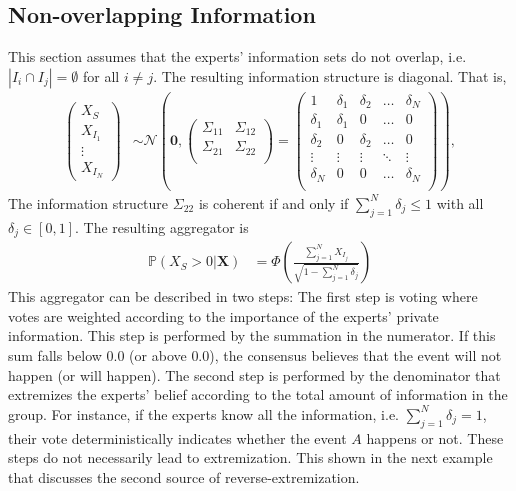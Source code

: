 \documentclass[11pt,twoside]{article}
\renewcommand{\P}{\mathbb{P}}
\theoremstyle{definition}
\theoremstyle{definition}
\begin{document}
\subsection{Non-overlapping Information}
\label{nonoverlap}
This section assumes that the experts' information sets do not overlap, i.e.   $|I_{i} \cap I_{j}| = \emptyset$ for all $i \neq j$. The resulting information structure is diagonal.  That is,
\begin{align*}
\left(\begin{matrix} X_{S} \\ X_{I_1}\\ \vdots \\ X_{I_N} \end{matrix}\right) &\sim \mathcal{N}\left( 
 \boldsymbol{0}, \left(\begin{matrix} 
\Sigma_{11} & \Sigma_{12}\\
\Sigma_{21} & \Sigma_{22}\\
 \end{matrix}\right) 
 =
 \left(\begin{array}{c|cccc}
1 & \delta_1 & \delta_2 & \dots & \delta_N  \\ \hline
\delta_1 & \delta_1 &0 & \dots & 0   \\ 
\delta_2 & 0 & \delta_2 & \dots & 0  \\ 
\vdots & \vdots & \vdots & \ddots & \vdots  \\ 
\delta_N & 0 & 0 & \dots & \delta_N\\ 
 \end{array}\right)\right),
\end{align*}
The information structure $\Sigma_{22}$  is coherent if and only if $\sum_{j=1}^N \delta_j \leq 1$ with all $\delta_j \in [0,1]$. The resulting aggregator is 
\begin{align}
\P\left(X_{S} > 0 | \boldsymbol{X}\right) &= \Phi\left( \frac{\sum_{j=1}^N X_{I_j}}{\sqrt{1 - \sum_{j=1}^N \delta_j}}\right) \label{VotingAggre}
\end{align}
This aggregator can be described in two steps: The first step is voting where votes are weighted according to the importance of the experts' private information. This step is performed by the summation in the numerator. If this sum falls below $0.0$ (or above $0.0$), the consensus believes that the event will not happen (or will happen). The second step is performed by the denominator that extremizes the experts' belief according to the total amount of information in the group. For instance, if the experts know all the information, i.e. $\sum_{j=1}^N \delta_j = 1$, their vote deterministically indicates whether the event $A$ happens or not. These steps do not necessarily lead to extremization. This shown in the next example that discusses the second source of reverse-extremization.
\end{document}
